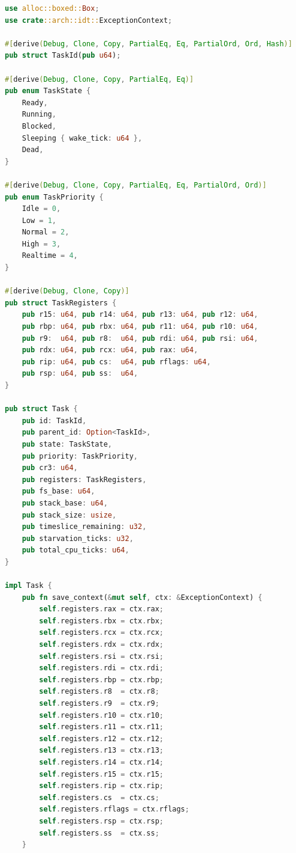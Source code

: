 \begin{lstlisting}[language=Rust, caption={Task Control Block and Context Definition (\texttt{src/task/tcb.rs})}]
use alloc::boxed::Box;
use crate::arch::idt::ExceptionContext;

#[derive(Debug, Clone, Copy, PartialEq, Eq, PartialOrd, Ord, Hash)]
pub struct TaskId(pub u64);

#[derive(Debug, Clone, Copy, PartialEq, Eq)]
pub enum TaskState {
    Ready,
    Running,
    Blocked,
    Sleeping { wake_tick: u64 },
    Dead,
}

#[derive(Debug, Clone, Copy, PartialEq, Eq, PartialOrd, Ord)]
pub enum TaskPriority {
    Idle = 0,
    Low = 1,
    Normal = 2,
    High = 3,
    Realtime = 4,
}

#[derive(Debug, Clone, Copy)]
pub struct TaskRegisters {
    pub r15: u64, pub r14: u64, pub r13: u64, pub r12: u64,
    pub rbp: u64, pub rbx: u64, pub r11: u64, pub r10: u64,
    pub r9:  u64, pub r8:  u64, pub rdi: u64, pub rsi: u64,
    pub rdx: u64, pub rcx: u64, pub rax: u64,
    pub rip: u64, pub cs:  u64, pub rflags: u64,
    pub rsp: u64, pub ss:  u64,
}

pub struct Task {
    pub id: TaskId,
    pub parent_id: Option<TaskId>,
    pub state: TaskState,
    pub priority: TaskPriority,
    pub cr3: u64,
    pub registers: TaskRegisters,
    pub fs_base: u64,
    pub stack_base: u64,
    pub stack_size: usize,
    pub timeslice_remaining: u32,
    pub starvation_ticks: u32,
    pub total_cpu_ticks: u64,
}

impl Task {
    pub fn save_context(&mut self, ctx: &ExceptionContext) {
        self.registers.rax = ctx.rax;
        self.registers.rbx = ctx.rbx;
        self.registers.rcx = ctx.rcx;
        self.registers.rdx = ctx.rdx;
        self.registers.rsi = ctx.rsi;
        self.registers.rdi = ctx.rdi;
        self.registers.rbp = ctx.rbp;
        self.registers.r8  = ctx.r8;
        self.registers.r9  = ctx.r9;
        self.registers.r10 = ctx.r10;
        self.registers.r11 = ctx.r11;
        self.registers.r12 = ctx.r12;
        self.registers.r13 = ctx.r13;
        self.registers.r14 = ctx.r14;
        self.registers.r15 = ctx.r15;
        self.registers.rip = ctx.rip;
        self.registers.cs  = ctx.cs;
        self.registers.rflags = ctx.rflags;
        self.registers.rsp = ctx.rsp;
        self.registers.ss  = ctx.ss;
    }


\end{lstlisting}
